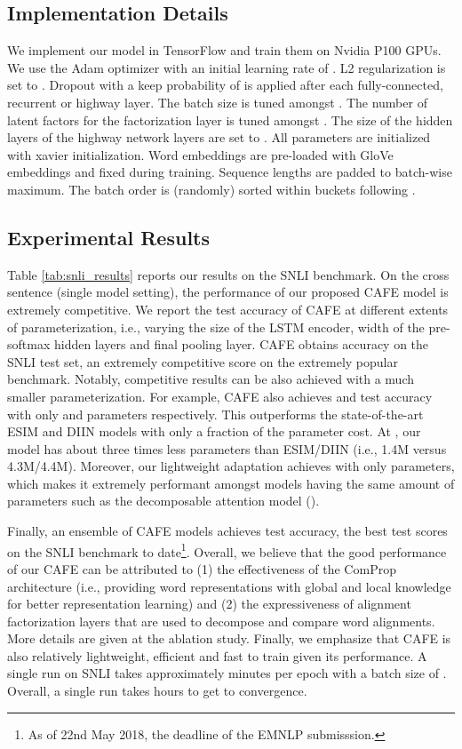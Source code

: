 \documentclass[11pt,a4paper]{article}
\begin{document}
\subsection{Implementation Details}
We implement our model in TensorFlow \cite{tensorflow2015-whitepaper} and train them on Nvidia P100 GPUs. We use the Adam optimizer \cite{DBLP:journals/corr/KingmaB14} with an initial learning rate of . L2 regularization is set to . Dropout with a keep probability of  is applied after each fully-connected, recurrent or highway layer. The batch size is tuned amongst . The number of latent factors  for the factorization layer is tuned amongst . The size of the hidden layers of the highway network layers are set to . All parameters are initialized with xavier initialization.  Word embeddings are pre-loaded with  GloVe embeddings \cite{DBLP:conf/emnlp/PenningtonSM14} and fixed during training. Sequence lengths are padded to batch-wise maximum. The batch order is (randomly) sorted within buckets following \cite{DBLP:conf/emnlp/ParikhT0U16}.


\subsection{Experimental Results}
Table \ref{tab:snli_results} reports our results on the SNLI benchmark. On the cross sentence (single model setting), the performance of our proposed CAFE model is extremely competitive. We report the test accuracy of CAFE at different extents of parameterization, i.e., varying the size of the LSTM encoder, width of the pre-softmax hidden layers and final pooling layer. CAFE obtains  accuracy on the SNLI test set, an extremely competitive score on the extremely popular benchmark. Notably, competitive results can be also achieved with a much smaller parameterization. For example, CAFE also achieves  and  test accuracy with only  and  parameters respectively. This outperforms the state-of-the-art ESIM and DIIN models with only a fraction of the parameter cost. At , our model has about three times less parameters than ESIM/DIIN (i.e., 1.4M versus 4.3M/4.4M). Moreover, our lightweight adaptation achieves  with only  parameters, which makes it extremely performant amongst models having the same amount of parameters such as the decomposable attention model ().



Finally, an ensemble of  CAFE models achieves  test accuracy, the best test scores on the SNLI benchmark to date\footnote{As of 22nd May 2018, the deadline of the EMNLP submisssion.}. Overall, we believe that the good performance of our CAFE can be attributed to (1) the effectiveness of the ComProp architecture (i.e., providing word representations with global and local knowledge for better representation learning) and (2) the expressiveness of alignment factorization layers that are used to decompose and compare word alignments. More details are given at the ablation study. Finally, we emphasize that CAFE is also relatively lightweight, efficient and fast to train given its performance. A single run on SNLI takes approximately  minutes per epoch with a batch size of . Overall, a single run takes  hours to get to convergence.
\end{document}
